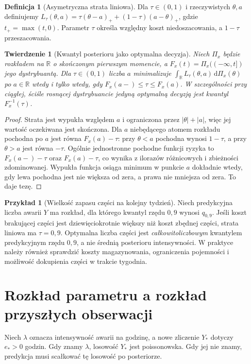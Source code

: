 \documentclass[11pt,a4paper,oneside]{report}
\numberwithin{equation}{chapter}
\theoremstyle{plain}
\newtheorem{twierdzenie}{Twierdzenie}[chapter]
\theoremstyle{definition}
\newtheorem{definicja}{Definicja}[chapter]
\newtheorem{przyklad}{Przykład}[chapter]
\theoremstyle{remark}
\newcommand{\R}{\mathbb R}
\newcommand{\dd}{\mathrm d}
\begin{document}
\begin{definicja}[Asymetryczna strata liniowa]
Dla $\tau\in(0,1)$ i rzeczywistych $\theta,a$ definiujemy
$L_\tau(\theta,a)=\tau(\theta-a)_++(1-\tau)(a-\theta)_+$,
gdzie $t_+=\max(t,0)$. Parametr $\tau$ określa względny
koszt niedoszacowania, a $1-\tau$ przeszacowania.
\end{definicja}

\begin{twierdzenie}[Kwantyl posterioru jako optymalna decyzja]
\label{thm:bayes-quantile-loss}
Niech $\Pi_x$ będzie rozkładem na $\R$ o skończonym
pierwszym momencie, a $F_x(t)=\Pi_x(({-}\infty,t])$ jego
dystrybuantą. Dla $\tau\in(0,1)$ liczba $a$ minimalizuje
$\int_\R L_\tau(\theta,a)\,\dd\Pi_x(\theta)$ po $a\in\R$
wtedy i tylko wtedy, gdy
$F_x(a-)\le\tau\le F_x(a)$.
W szczególności przy ciągłej, ściśle rosnącej dystrybuancie
jedyną optymalną decyzją jest kwantyl $F_x^{-1}(\tau)$.
\end{twierdzenie}
\begin{proof}
Strata jest wypukła względem $a$ i ograniczona przez
$|\theta|+|a|$, więc jej wartość oczekiwana jest skończona.
Dla $a$ niebędącego atomem rozkładu pochodna po $a$ jest
równa $F_x(a)-\tau$: przy $\theta<a$ pochodna wynosi
$1-\tau$, a przy $\theta>a$ jest równa $-\tau$.
Ogólnie jednostronne pochodne funkcji ryzyka to
$F_x(a-)-\tau$ oraz $F_x(a)-\tau$, co wynika
z ilorazów różnicowych i zbieżności zdominowanej.
Wypukła funkcja osiąga minimum w punkcie $a$ dokładnie
wtedy, gdy lewa pochodna jest nie większa od zera,
a prawa nie mniejsza od zera. To daje tezę.
\end{proof}

\begin{przyklad}[Wielkość zapasu części na kolejny tydzień]
Niech predykcyjna liczba awarii $Y$ ma rozkład, dla którego
kwantyl rzędu $0{,}9$ wynosi $q_{0{,}9}$. Jeśli koszt
brakującej części jest dziewięciokrotnie większy niż koszt
zbędnej części, strata liniowa ma $\tau=0{,}9$.
Optymalna liczba części jest \emph{całkowitoliczbowym}
kwantylem predykcyjnym rzędu $0{,}9$, a nie średnią
posterioru intensywności. W praktyce należy również sprawdzić
koszty magazynowania, ograniczenia pojemności i możliwość
dokupienia części w trakcie tygodnia.
\end{przyklad}

\section{Rozkład parametru a rozkład przyszłych obserwacji}
Niech $\lambda$ oznacza intensywność awarii na godzinę,
a nowe zliczenie $Y_*$ dotyczy $e_*>0$ godzin. Gdy znamy
$\lambda$, losowość $Y_*$ jest poissonowska. Gdy jej nie
znamy, predykcja musi scałkować tę losowość po posteriorze.
\end{document}
